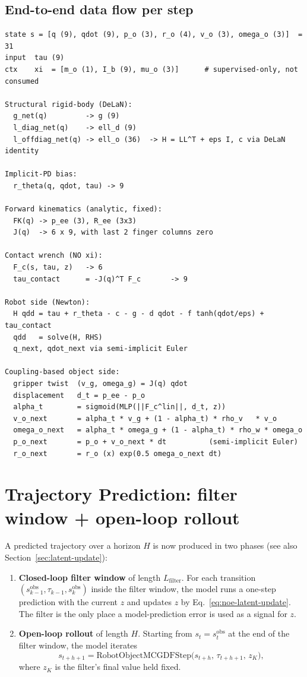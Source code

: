 \documentclass[11pt]{article}
\begin{document}
\subsection{End-to-end data flow per step}

\begin{lstlisting}
state s = [q (9), qdot (9), p_o (3), r_o (4), v_o (3), omega_o (3)]  = 31
input  tau (9)
ctx    xi  = [m_o (1), I_b (9), mu_o (3)]      # supervised-only, not consumed

Structural rigid-body (DeLaN):
  g_net(q)         -> g (9)
  l_diag_net(q)    -> ell_d (9)
  l_offdiag_net(q) -> ell_o (36)  -> H = LL^T + eps I, c via DeLaN identity

Implicit-PD bias:
  r_theta(q, qdot, tau) -> 9

Forward kinematics (analytic, fixed):
  FK(q) -> p_ee (3), R_ee (3x3)
  J(q)  -> 6 x 9, with last 2 finger columns zero

Contact wrench (NO xi):
  F_c(s, tau, z)   -> 6
  tau_contact      = -J(q)^T F_c       -> 9

Robot side (Newton):
  H qdd = tau + r_theta - c - g - d qdot - f tanh(qdot/eps) + tau_contact
  qdd   = solve(H, RHS)
  q_next, qdot_next via semi-implicit Euler

Coupling-based object side:
  gripper twist  (v_g, omega_g) = J(q) qdot
  displacement   d_t = p_ee - p_o
  alpha_t        = sigmoid(MLP(||F_c^lin||, d_t, z))
  v_o_next       = alpha_t * v_g + (1 - alpha_t) * rho_v   * v_o
  omega_o_next   = alpha_t * omega_g + (1 - alpha_t) * rho_w * omega_o
  p_o_next       = p_o + v_o_next * dt          (semi-implicit Euler)
  r_o_next       = r_o (x) exp(0.5 omega_o_next dt)
\end{lstlisting}

\section{Trajectory Prediction: filter window + open-loop rollout}
\label{sec:trajectory-prediction}

A predicted trajectory over a horizon $H$ is now produced in two
phases (see also Section~\ref{sec:latent-update}):

\begin{enumerate}
  \item \textbf{Closed-loop filter window} of length
    $L_{\mathrm{filter}}$.  For each transition
    $(s_{k-1}^{\mathrm{obs}}, \tau_{k-1}, s_k^{\mathrm{obs}})$
    inside the filter window, the model runs a one-step prediction
    with the current $z$ and updates $z$ by
    Eq.~\eqref{eq:noe-latent-update}.  The filter is the only place
    a model-prediction error is used as a signal for $z$.
  \item \textbf{Open-loop rollout} of length $H$.  Starting from
    $s_t = s_{t}^{\mathrm{obs}}$ at the end of the filter window, the
    model iterates
    \begin{equation}
      s_{t+h+1} = \mathrm{RobotObjectMCGDFStep}\bigl(s_{t+h},\,\tau_{t+h+1},\,z_K\bigr),
    \end{equation}
    where $z_K$ is the filter's final value held fixed.
\end{enumerate}
\end{document}
